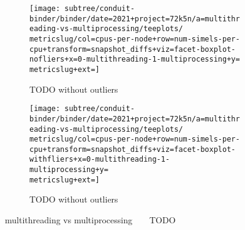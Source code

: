 \begin{figure*}
  \centering
  \begin{subfigure}[b]{0.5\textwidth}
    \centering
    \texttt{[image: subtree/conduit-binder/binder/date=2021+project=72k5n/a=multithreading-vs-multiprocessing/teeplots/\\metricslug/col=cpus-per-node+row=num-simels-per-cpu+transform=snapshot\_diffs+viz=facet-boxplot-nofliers+x=0-multithreading-1-multiprocessing+y=\\metricslug+ext=]}
    \caption{TODO without outliers}
    \label{fig:multithreading-vs-multiprocessing-distribution-\metricslug-nofliers}
  \end{subfigure}%
  \begin{subfigure}[b]{0.5\textwidth}
    \centering
    \texttt{[image: subtree/conduit-binder/binder/date=2021+project=72k5n/a=multithreading-vs-multiprocessing/teeplots/\\metricslug/col=cpus-per-node+row=num-simels-per-cpu+transform=snapshot\_diffs+viz=facet-boxplot-withfliers+x=0-multithreading-1-multiprocessing+y=\\metricslug+ext=]}
    \caption{TODO without outliers}
    \label{fig:multithreading-vs-multiprocessing-distribution-\metricslug-withfliers}
  \end{subfigure}
  \caption{multithreading vs multiprocessing ~ \metric ~ TODO}
  \label{fig:multithreading-vs-multiprocessing-distribution-\metricslug}
\end{figure*}
